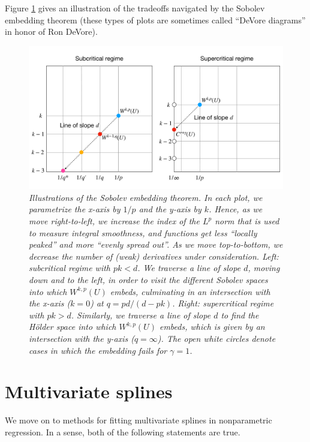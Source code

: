 \documentclass{article}
\begin{document}
Figure \ref{fig:sobolev} gives an illustration of the tradeoffs navigated by the
Sobolev embedding theorem (these types of plots are sometimes called ``DeVore
diagrams'' in honor of Ron DeVore).   

\begin{figure}[tb]
\centering
\includegraphics[width=\textwidth]{sobolev.pdf}
\caption{\it Illustrations of the Sobolev embedding theorem. In each plot, we 
  parametrize the x-axis by $1/p$ and the y-axis by $k$. Hence, as we move
  right-to-left, we increase the index of the $L^p$ norm that is used to measure 
  integral smoothness, and functions get less ``locally peaked'' and more 
  ``evenly spread out''. As we move top-to-bottom, we decrease the number of
  (weak) derivatives under consideration. Left: subcritical regime with $pk <
  d$. We traverse a line of slope $d$, moving down and to the left, in order to
  visit the different Sobolev spaces into which $W^{k,p}(U)$ embeds, culminating
  in an intersection with the x-axis ($k=0$) at $q = pd/(d-pk)$. Right:
  supercritical regime with $pk > d$. Similarly, we traverse a line of slope $d$
  to find the H{\"o}lder space into which $W^{k,p}(U)$ embeds, which is given by
  an intersection with the y-axis ($q = \infty$). The open white circles denote
  cases in which the embedding fails for $\gamma = 1$.}  
\label{fig:sobolev}
\end{figure}

\section{Multivariate splines}

We move on to methods for fitting multivariate splines in nonparametric
regression. In a sense, both of the following statements are true. 
\end{document}
